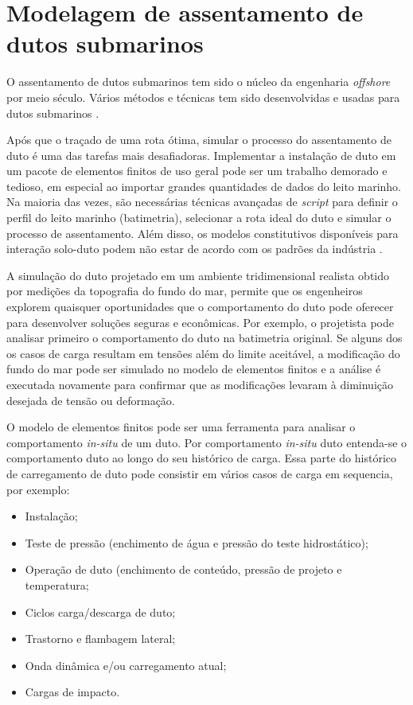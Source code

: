 \chapter{Modelagem de assentamento de dutos submarinos}
\label{chap:assentamento}

O assentamento de dutos submarinos tem sido o núcleo da engenharia \textit{offshore} por meio século. Vários métodos e técnicas tem sido desenvolvidas e usadas para dutos submarinos \cite[]{Ivic2016}.

Após que o traçado de uma rota ótima, simular o processo do assentamento de duto é uma das tarefas mais desafiadoras. Implementar a instalação de duto em um pacote de elementos finitos de uso geral pode ser um trabalho demorado e tedioso, em especial ao importar grandes quantidades de dados do leito marinho. Na maioria das vezes, são necessárias técnicas avançadas de \textit{script} para definir o perfil do leito marinho (batimetria), selecionar a rota ideal do duto e simular o processo de assentamento. Além disso, os modelos constitutivos disponíveis para interação solo-duto podem não estar de acordo com os padrões da indústria \cite[]{VandenAbeele2013}.

A simulação do duto projetado em um ambiente tridimensional realista obtido por medições da topografia do fundo do mar, permite que os engenheiros explorem quaisquer oportunidades que o comportamento do duto pode oferecer para desenvolver soluções seguras e econômicas. Por exemplo, o projetista pode analisar primeiro o comportamento do duto na batimetria original. Se alguns dos os casos de carga resultam em tensões além do limite aceitável, a modificação do fundo do mar pode ser simulado no modelo de elementos finitos e a análise é executada novamente para confirmar que as modificações levaram à diminuição desejada de tensão ou deformação.

O modelo de elementos finitos pode ser uma ferramenta para analisar o comportamento \textit{in-situ} de um duto. Por comportamento \textit{in-situ} duto entenda-se o comportamento duto ao longo do seu histórico de carga. Essa parte do histórico de carregamento de duto pode consistir em vários casos de carga em sequencia, por exemplo:

\begin{itemize}
    \item Instalação;
    \item Teste de pressão (enchimento de água e pressão do teste hidrostático);
    \item Operação de duto (enchimento de conteúdo, pressão de projeto e temperatura;
    \item Ciclos carga/descarga de duto;
    \item Trastorno e flambagem lateral;
    \item Onda dinâmica e/ou carregamento atual;
    \item Cargas de impacto.
\end{itemize}

